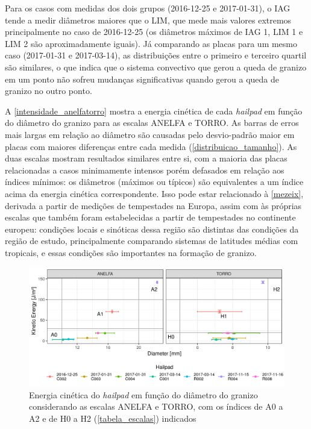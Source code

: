 Para os casos com medidas dos dois grupos (2016-12-25 e 2017-01-31), o IAG tende a medir diâmetros maiores que o LIM, que mede mais valores extremos principalmente no caso de 2016-12-25 (os diâmetros máximos de IAG 1, LIM 1 e LIM 2 são aproximadamente iguais). Já comparando as placas para um mesmo caso (2017-01-31 e 2017-03-14), as distribuições entre o primeiro e terceiro quartil são similares, o que indica que o sistema convectivo que gerou a queda de granizo em um ponto não sofreu mudanças significativas quando gerou a queda de granizo no outro ponto. 

A \autoref{intensidade_anelfatorro} mostra a energia cinética de cada \textit{hailpad} em função do diâmetro do granizo para as escalas ANELFA e TORRO. As barras de erros mais largas em relação ao diâmetro são causadas pelo desvio-padrão maior em placas com maiores diferenças entre cada medida (\autoref{distribuicao_tamanho}). As duas escalas mostram resultados similares entre si, com a maioria das placas relacionadas a casos minimamente intensos porém defasados em relação aos índices mínimos: os diâmetros (máximos ou típicos) são equivalentes a um índice acima da energia cinética correspondente. Isso pode estar relacionado à \autoref{mezeix}, derivada a partir de medições de tempestades na Europa, assim com às próprias escalas que também foram estabelecidas a partir de tempestades no continente europeu: condições locais e sinóticas dessa região são distintas das condições da região de estudo, principalmente comparando sistemas de latitudes médias com tropicais, e essas condições são importantes na formação de granizo.

\begin{figure}[hbt]
	\begin{center}
		\caption{Energia cinética do \textit{hailpad} em função do diâmetro do granizo considerando as escalas ANELFA e TORRO, com os índices de A0 a A2 e de H0 a H2 (\autoref{tabela_escalas}) indicados} 
		\label{intensidade_anelfatorro}
		\includegraphics[width=\columnwidth]{../Hailpads_Processing/figures/data_anelfa_torro.png}
	\end{center}
\end{figure}

